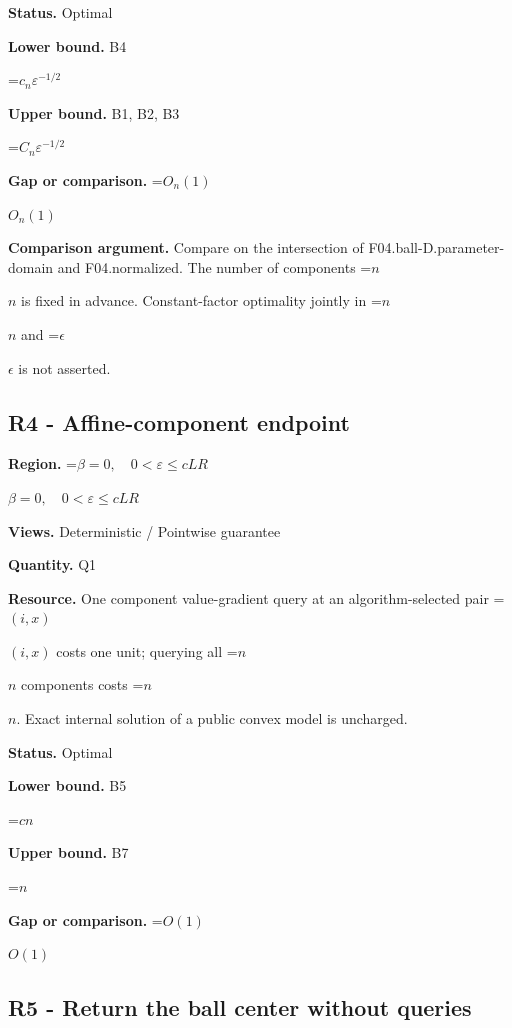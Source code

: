 \documentclass[10pt,a4paper]{article}
\newcommand{\AtlasMath}[1]{\par\begingroup\centering\setbox0=\hbox{$\displaystyle #1$}\ifdim\wd0>1.4\linewidth\typeout{ATLAS WIDE FORMULA: \the\wd0}\fi\ifdim\wd0>\linewidth\resizebox{\linewidth}{!}{\box0}\else\box0\fi\par\endgroup}
\newcommand{\AtlasInlineMath}[1]{\begingroup\setbox0=\hbox{$#1$}\ifdim\wd0>.4\linewidth\endgroup\AtlasMath{#1}\else\endgroup$#1$\fi}
\begin{document}
\textbf{Status.} Optimal



\textbf{Lower bound.} B4



\AtlasMath{c_n\varepsilon^{-1/2}}


\textbf{Upper bound.} B1, B2, B3



\AtlasMath{C_n\varepsilon^{-1/2}}


\textbf{Gap or comparison.} \AtlasInlineMath{O_n(1)}



\textbf{Comparison argument.} Compare on the intersection of F04.ball-D.parameter-domain and F04.normalized. The number of components \AtlasInlineMath{n} is fixed in advance. Constant-factor optimality jointly in \AtlasInlineMath{n} and \AtlasInlineMath{\epsilon} is not asserted.



\subsection{R4 - Affine-component endpoint}


\textbf{Region.} \AtlasInlineMath{\beta=0,\quad0<\varepsilon\le cLR}



\textbf{Views.} Deterministic / Pointwise guarantee



\textbf{Quantity.} Q1



\textbf{Resource.} One component value-gradient query at an algorithm-selected pair \AtlasInlineMath{(i,x)} costs one unit; querying all \AtlasInlineMath{n} components costs \AtlasInlineMath{n}. Exact internal solution of a public convex model is uncharged.



\textbf{Status.} Optimal



\textbf{Lower bound.} B5



\AtlasMath{cn}


\textbf{Upper bound.} B7



\AtlasMath{n}


\textbf{Gap or comparison.} \AtlasInlineMath{O(1)}



\subsection{R5 - Return the ball center without queries}
\end{document}
